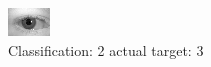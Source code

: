 \begin{figure}[h!]
\begin{center}
\includegraphics[width=0.60\columnwidth]{figures/ID525_class_2_target_3.png}
\end{center}
\caption{ Classification: 2 actual target: 3}
\label{fig:ID525_class_2_target_3}
\end{figure}
